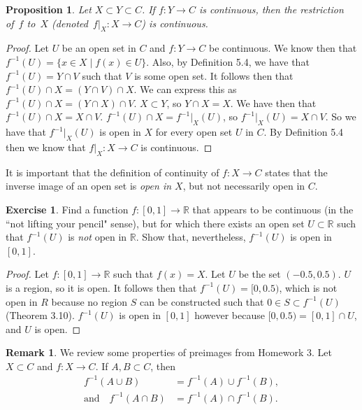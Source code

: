 \documentclass[12pt]{article}
\newcommand{\bbR}{\mathbb{R}}
\providecommand{\arr}{\to}
\renewcommand{\_}[1]{\underline{ #1 }}
\newtheorem{proposition}[theorem]{Proposition}
\theoremstyle{definition}
\newtheorem{exercise}[theorem]{Exercise}
\newtheorem{remark}[theorem]{Remark}
\numberwithin{equation}{subsection}
\begin{document}
\begin{proposition}
Let $X\subset Y\subset C$. If $f\colon Y\to C$ is continuous, then the restriction of~$f$ to~$X$ (denoted~$f|_X\colon X\to C$) is continuous.
\end{proposition}

\begin{proof}
Let $U$ be an open set in $C$ and $f : Y \to C$ be continuous. We know then that $f^{-1}(U) = \{x \in X \mid f(x) \in U\}$. Also, by Definition 5.4, we have that $f^{-1}(U) = Y \cap V$ such that $V$ is some open set. It follows then that $f^{-1}(U) \cap X = (Y \cap V) \cap X$. We can express this as $f^{-1}(U) \cap X = (Y \cap X) \cap V$. $X \subset Y$, so $Y \cap X = X$. We have then that $f^{-1}(U) \cap X = X \cap V$. $f^{-1}(U) \cap X = f^{-1}|_X(U)$, so $f^{-1}|_X(U) = X \cap V$. So we have that $f^{-1}|_X(U)$ is open in $X$ for every open set $U$ in $C$. By Definition 5.4 then we know that $f|_X\colon X\to C$ is continuous.
\end{proof}

It is important that the definition of continuity of $f\colon X\arr C$ states that the inverse image of an open set is 
{\em open in $X$}, but not necessarily open in $C$. 
\begin{exercise}  Find a function $f \colon [0, 1] \arr \bbR$ that appears to be continuous (in the ``not lifting your pencil" sense), but for which there exists an open set $U \subset \bbR$ such that $f^{-1}(U)$ is \emph{not} open in $\bbR$. Show that, nevertheless, $f^{-1}(U)$ is open in $[0,1]$.
\end{exercise}

\begin{proof}
Let $f : [0,1] \to \mathbb R$ such that $f(x) = X$. Let $U$ be the set $(-0.5,0.5)$. $U$ is a region, so it is open. It follows then that $f^{-1}(U)= [0,0.5)$, which is not open in $R$ because no region $S$ can be constructed such that $0 \in S \subset f^{-1}(U)$ (Theorem 3.10). $f^{-1}(U)$ is open in $[0,1]$ however because $[0,0.5) = [0,1] \cap U$, and $U$ is open.
\end{proof}

\begin{remark}
We review some properties of preimages from Homework 3.  
Let $X\subset C$ and $f\colon X\arr C$.
If $A, B \subset C$,  then
\begin{align*}
f^{-1}(A\cup B) &= f^{-1}(A) \cup f^{-1}(B),\\
\text{and}\quad
f^{-1}(A\cap B) &= f^{-1}(A) \cap f^{-1}(B).
\end{align*}
\end{remark}
\end{document}
